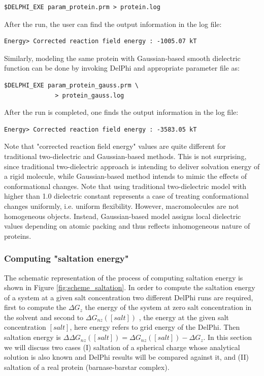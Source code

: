\documentclass[9pt,tutorial]{livecoms}
\begin{document}
\begin{verbatim}
$DELPHI_EXE param_protein.prm > protein.log
\end{verbatim}

After the run, the user can find the output information in the log file: 

\begin{verbatim}
Energy> Corrected reaction field energy : -1005.07 kT
\end{verbatim}

Similarly, modeling the same protein with Gaussian-based smooth dielectric function can be done by invoking DelPhi and appropriate parameter file as:

\begin{verbatim}
$DELPHI_EXE param_protein_gauss.prm \
              > protein_gauss.log
\end{verbatim}

After the run is completed, one finds the output information in the log file: 

\begin{verbatim}
Energy> Corrected reaction field energy : -3583.05 kT
\end{verbatim}

Note that "corrected reaction field energy" values are quite different for traditional two-dielectric and Gaussian-based methods. This is not surprising, since traditional two-dielectric approach is intending to deliver solvation energy of a rigid molecule, while Gaussian-based method intends to mimic the effects of conformational changes. Note that using traditional two-dielectric model with higher than 1.0  dielectric constant represents a case of treating conformational changes uniformly, i.e. uniform flexibility. However, macromolecules are not homogeneous objects. Instead, Gaussian-based model assigns local dielectric values depending on atomic packing and thus reflects inhomogeneous nature of proteins.

\subsubsection{Computing "saltation energy"}

The schematic representation of the process of computing saltation energy is shown in Figure \ref{fig:scheme_saltation}. In order to compute the saltation energy of a system at a given salt concentration two different DelPhi runs are required, first to compute the $ \Delta G_{z} $ the energy of the system at zero salt concentration in the solvent and second to $ \Delta G_{nz}([salt]) $ , the energy at the given salt concentration $[salt]$, here energy refers to grid energy of the DelPhi. Then saltation energy is $ \Delta\Delta G_{nz}([salt]) = \Delta G_{nz}([salt]) - \Delta G_{z}$. In this section we will discuss two cases (I) saltation of a spherical charge whose analytical solution is also known and DelPhi results will be compared against it, and (II) saltation of a real protein (barnase-barstar complex).
\newline
\newline
\end{document}
